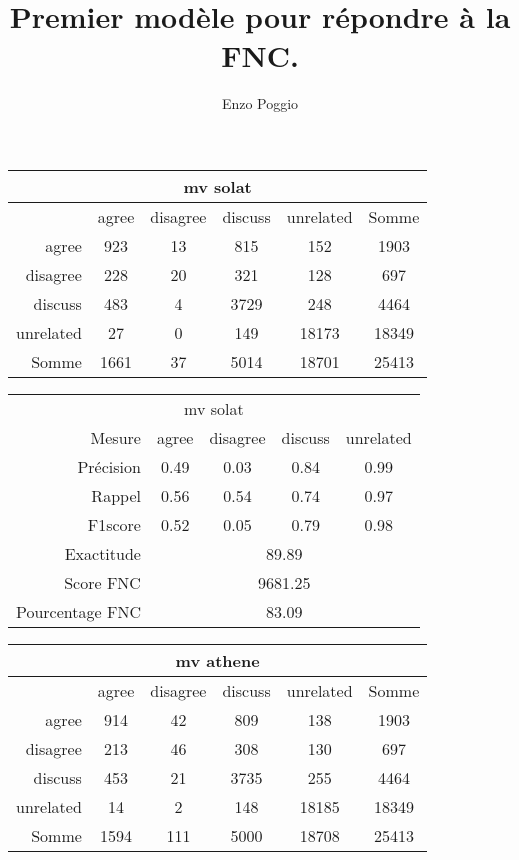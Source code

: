 \documentclass[onecolumn, 12pt]{article}
\title{Premier modèle pour répondre à la FNC.}
\author{Enzo Poggio}
\begin{document}
\maketitle{}

\begin{center}
 \begin{tabular}{ r | c c c c | c }
  \multicolumn{6}{c}{mv solat}\\
  \hline
            & agree & disagree & discuss & unrelated & Somme \\
  \hline
  agree     & 923   & 13       & 815     & 152       & 1903  \\
  disagree  & 228   & 20       & 321     & 128       & 697   \\
  discuss   & 483   & 4        & 3729    & 248       & 4464  \\
  unrelated & 27    & 0        & 149     & 18173     & 18349 \\
  \hline
  Somme     & 1661  & 37       & 5014    & 18701     & 25413 \\
 \end{tabular}
\end{center}


\begin{center}
 \begin{tabular}{ r | c c c c }
  \multicolumn{5}{c}{mv solat}\\
  Mesure     & agree & disagree & discuss & unrelated \\
  \hline
  Précision & 0.49  & 0.03     & 0.84    & 0.99      \\
  Rappel     & 0.56  & 0.54     & 0.74    & 0.97      \\
  F1score    & 0.52  & 0.05     & 0.79    & 0.98      \\
  \hline
  \hline
  Exactitude & \multicolumn{4}{c}{89.89}\\
  Score FNC & \multicolumn{4}{c}{9681.25}\\
  Pourcentage FNC & \multicolumn{4}{c}{83.09}\\
 \end{tabular}
\end{center}



\begin{center}
 \begin{tabular}{ r | c c c c | c }
  \multicolumn{6}{c}{mv athene}\\
  \hline
            & agree & disagree & discuss & unrelated & Somme \\
  \hline
  agree     & 914   & 42       & 809     & 138       & 1903  \\
  disagree  & 213   & 46       & 308     & 130       & 697   \\
  discuss   & 453   & 21       & 3735    & 255       & 4464  \\
  unrelated & 14    & 2        & 148     & 18185     & 18349 \\
  \hline
  Somme     & 1594  & 111      & 5000    & 18708     & 25413 \\
 \end{tabular}
\end{center}
\end{document}
